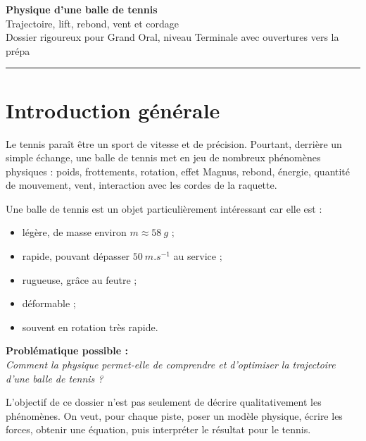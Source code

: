\documentclass[11pt,a4paper]{article}
\begin{document}
\begin{center}
    {\Huge \textbf{Physique d'une balle de tennis}}\\[0.2cm]
    {\Large Trajectoire, lift, rebond, vent et cordage}\\[0.2cm]
    {\large Dossier rigoureux pour Grand Oral, niveau Terminale avec ouvertures vers la prépa}\\[0.4cm]
    \rule{0.85\linewidth}{0.5pt}
\end{center}

\vspace{0.4cm}

\tableofcontents

\newpage

\section{Introduction générale}

Le tennis paraît être un sport de vitesse et de précision. Pourtant, derrière un simple échange, une balle de tennis met en jeu de nombreux phénomènes physiques : poids, frottements, rotation, effet Magnus, rebond, énergie, quantité de mouvement, vent, interaction avec les cordes de la raquette.

\medskip

Une balle de tennis est un objet particulièrement intéressant car elle est :
\begin{itemize}
    \item légère, de masse environ $m \approx \SI{58}{g}$ ;
    \item rapide, pouvant dépasser $\SI{50}{m.s^{-1}}$ au service ;
    \item rugueuse, grâce au feutre ;
    \item déformable ;
    \item souvent en rotation très rapide.
\end{itemize}

\begin{center}
\Large
\textbf{Problématique possible :}\\[0.2cm]
\textit{Comment la physique permet-elle de comprendre et d'optimiser la trajectoire d'une balle de tennis ?}
\end{center}

\medskip

L'objectif de ce dossier n'est pas seulement de décrire qualitativement les phénomènes. On veut, pour chaque piste, poser un modèle physique, écrire les forces, obtenir une équation, puis interpréter le résultat pour le tennis.
\end{document}
